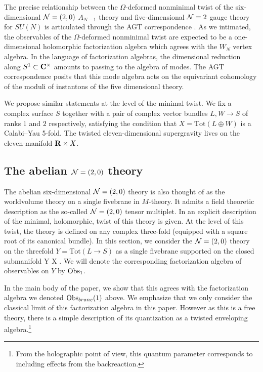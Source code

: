 The precise relationship between the $\Omega$-deformed nonminimal twist of the six-dimensional $\mathcal N=(2,0)$ $A_{N-1}$ theory and five-dimensional $\mathcal N=2$ gauge theory for $SU(N)$ is articulated through the AGT correspondence \cite{AGT}. As we intimated, the observables of the $\Omega$-deformed nonminimal twist are expected to be a one-dimensional holomorphic factorization algebra which agrees with the $W_{N}$ vertex algebra. In the language of factorization algebras, the dimensional reduction along $S^{1}\subset \mathbf{C}^{\times}$ amounts to passing to the algebra of modes. The AGT correspondence posits that this mode algebra acts on the equivariant cohomology of the moduli of instantons of the five dimensional theory.

We propose similar statements at the level of the minimal twist. 
We fix a complex surface $S$ together with a pair of complex vector bundles $L,W \to S$ of ranks $1$ and $2$ respectively, satisfying the condition that $X = \text{Tot} (L \oplus W)$ is a Calabi--Yau 5-fold.
The twisted eleven-dimensional supergravity lives on the eleven-manifold $\mathbf{R} \times X$. 

\subsection*{The abelian $\mathcal N=(2,0)$ theory}

The abelian six-dimensional $\mathcal N=(2,0)$ theory is also thought of as the worldvolume theory on a single fivebrane in $M$-theory. 
It admits a field theoretic description as the so-called $\mathcal N=(2,0)$ tensor multiplet. 
In \cite{SWtensor} an explicit description of the minimal, holomorphic, twist of this theory is given.
At the level of this twist, the theory is defined on any complex three-fold (equipped with a square root of its canonical bundle). 
In this section, we consider the $\mathcal N=(2,0)$ theory on the threefold $Y = \text{Tot}(L \to S)$ as a single fivebrane supported on the closed submanifold
\beqn
Y \hookrightarrow \R \times X .
\eeqn
We will denote the corresponding factorization algebra of observables on $Y$ by $\operatorname{Obs}_1$.

In the main body of the paper, we show that this agrees with the factorization algebra we denoted $\operatorname{Obs}_{brane}(1)$ above. We emphasize that we only consider the classical limit of this factorization algebra in this paper. However as this is a free theory, there is a simple description of its quantization as a twisted enveloping algebra.\footnote{From the holographic point of view, this quantum parameter corresponds to including effects from the backreaction.}

